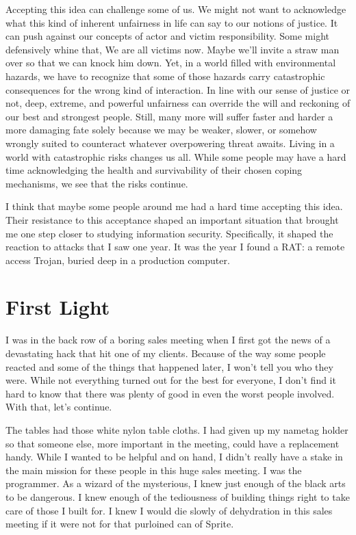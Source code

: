 Accepting this idea can challenge some of us.  We might not want to acknowledge what this kind of inherent unfairness in life can say to our notions of justice.  It can push against our concepts of actor and victim responsibility.  Some might defensively whine that, We are all victims now.  Maybe we'll invite a straw man over so that we can knock him down.  Yet, in a world filled with environmental hazards, we have to recognize that some of those hazards carry catastrophic consequences for the wrong kind of interaction.  In line with our sense of justice or not, deep, extreme, and powerful unfairness can override the will and reckoning of our best and strongest people.  Still, many more will suffer faster and harder a more damaging fate solely because we may be weaker, slower, or somehow wrongly suited to counteract whatever overpowering \gls{threat} awaits.  Living in a world with catastrophic risks changes us all.  While some people may have a hard time acknowledging the health and survivability of their chosen coping mechanisms, we see that the risks continue.

I think that maybe some people around me had a hard time accepting this idea.  Their resistance to this acceptance shaped an important situation that brought me one step closer to studying information security.  Specifically, it shaped the reaction to attacks that I saw one year.  It was the year I found a RAT:  a remote access Trojan, buried deep in a production computer.

\section{First Light}

I was in the back row of a boring sales meeting when I first got the news of a devastating hack that hit one of my clients.  Because of the way some people reacted and some of the things that happened later, I won't tell you who they were.  While not everything turned out for the best for everyone, I don't find it hard to know that there was plenty of good in even the worst people involved.  With that, let's continue.

The tables had those white nylon table cloths.  I had given up my nametag holder so that someone else, more important in the meeting, could have a replacement handy.  While I wanted to be helpful and on hand, I didn't really have a stake in the main mission for these people in this huge sales meeting.  I was the programmer.  As a wizard of the mysterious, I knew just enough of the black arts to be dangerous.  I knew enough of the tediousness of building things right to take care of those I built for.  I knew I would die slowly of dehydration in this sales meeting if it were not for that purloined can of Sprite.

